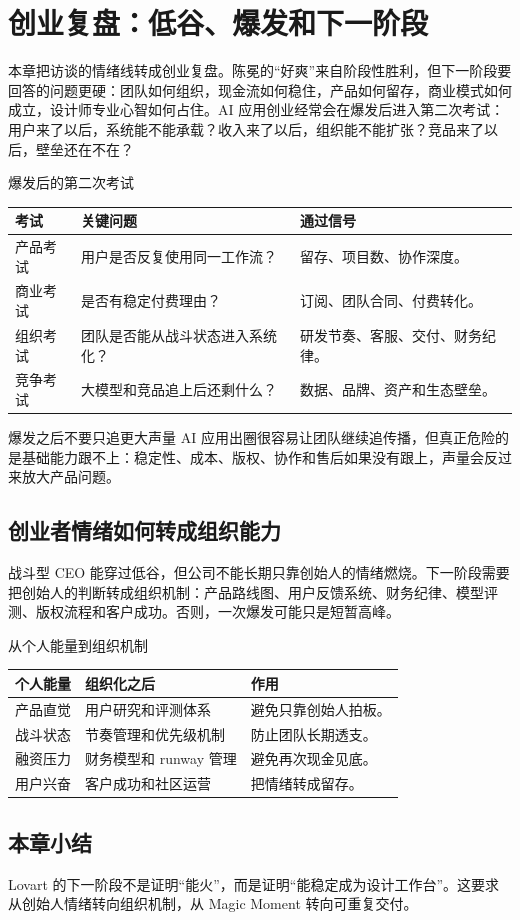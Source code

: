 \section{创业复盘：低谷、爆发和下一阶段}

本章把访谈的情绪线转成创业复盘。陈冕的“好爽”来自阶段性胜利，但下一阶段要回答的问题更硬：团队如何组织，现金流如何稳住，产品如何留存，商业模式如何成立，设计师专业心智如何占住。AI 应用创业经常会在爆发后进入第二次考试：用户来了以后，系统能不能承载？收入来了以后，组织能不能扩张？竞品来了以后，壁垒还在不在？

\begin{knowledgebox}{爆发后的第二次考试}
\begin{tabularx}{\textwidth}{p{}p{}X}
\toprule
考试 & 关键问题 & 通过信号 \\
\midrule
产品考试 & 用户是否反复使用同一工作流？ & 留存、项目数、协作深度。 \\
商业考试 & 是否有稳定付费理由？ & 订阅、团队合同、付费转化。 \\
组织考试 & 团队是否能从战斗状态进入系统化？ & 研发节奏、客服、交付、财务纪律。 \\
竞争考试 & 大模型和竞品追上后还剩什么？ & 数据、品牌、资产和生态壁垒。 \\
\bottomrule
\end{tabularx}
\end{knowledgebox}

\begin{warningbox}{爆发之后不要只追更大声量}
AI 应用出圈很容易让团队继续追传播，但真正危险的是基础能力跟不上：稳定性、成本、版权、协作和售后如果没有跟上，声量会反过来放大产品问题。
\end{warningbox}

\subsection{创业者情绪如何转成组织能力}

战斗型 CEO 能穿过低谷，但公司不能长期只靠创始人的情绪燃烧。下一阶段需要把创始人的判断转成组织机制：产品路线图、用户反馈系统、财务纪律、模型评测、版权流程和客户成功。否则，一次爆发可能只是短暂高峰。

\begin{knowledgebox}{从个人能量到组织机制}
\begin{tabularx}{\textwidth}{p{}p{}X}
\toprule
个人能量 & 组织化之后 & 作用 \\
\midrule
产品直觉 & 用户研究和评测体系 & 避免只靠创始人拍板。 \\
战斗状态 & 节奏管理和优先级机制 & 防止团队长期透支。 \\
融资压力 & 财务模型和 runway 管理 & 避免再次现金见底。 \\
用户兴奋 & 客户成功和社区运营 & 把情绪转成留存。 \\
\bottomrule
\end{tabularx}
\end{knowledgebox}

\subsection{本章小结}

Lovart 的下一阶段不是证明“能火”，而是证明“能稳定成为设计工作台”。这要求从创始人情绪转向组织机制，从 Magic Moment 转向可重复交付。

